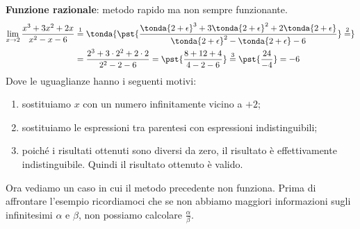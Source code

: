 \begin{esempio}
\textbf{Funzione razionale}: metodo rapido ma non sempre funzionante.
\begin{align*}
\lim_{x \rightarrow 2} \frac{x^3+3x^2+2x}{x^2-x-6} & \stackrel{1}{=} 
\tonda{\pst{\frac
  {\tonda{2+\epsilon}^3+3\tonda{2+\epsilon}^2+2\tonda{2+\epsilon}}
  {\tonda{2+\epsilon}^2-\tonda{2+\epsilon}-6}} \stackrel{2}{=}}\\ 
  &=\frac{2^3+3\cdot 2^2+2\cdot 2}{2^2-2-6} =
  \pst{\frac{8+12+4}{4-2-6}} \stackrel{3}{=} \pst{\frac{24}{-4}} =-6
\end{align*}
Dove le uguaglianze hanno i seguenti motivi:
\begin{enumerate} [nosep]
 \item sostituiamo \(x\) con un numero infinitamente vicino a \(+2\);
 \item sostituiamo le espressioni tra parentesi con espressioni 
indistinguibili;
 \item poiché i risultati ottenuti sono diversi da zero, il risultato è 
effettivamente indistinguibile. Quindi il risultato ottenuto è valido.
\end{enumerate}
\end{esempio}

Ora vediamo un caso in cui il metodo precedente non funziona. Prima di 
affrontare l'esempio ricordiamoci che se non abbiamo maggiori informazioni 
sugli infinitesimi \(\alpha\) e \(\beta\), non possiamo calcolare 
\(\frac{\alpha}{\beta}\).

